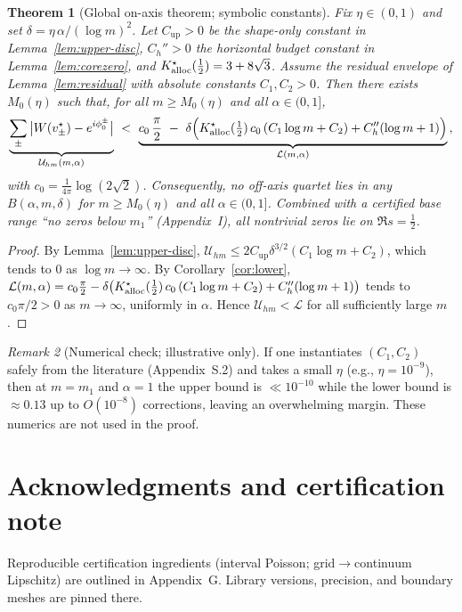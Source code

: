 \documentclass[11pt]{article}
\numberwithin{equation}{section}
\newtheorem{theorem}{Theorem}[section]
\theoremstyle{remark}
\newtheorem{remark}[theorem]{Remark}
\begin{document}
\begin{theorem}[Global on-axis theorem; symbolic constants]\label{thm:tail-symbolic}
Fix $\eta\in(0,1)$ and set $\delta=\eta\,\alpha/(\log m)^2$. Let $C_{\mathrm{up}}>0$ be the shape-only constant in Lemma~\ref{lem:upper-disc}, $C_h''>0$ the horizontal budget constant in Lemma~\ref{lem:corezero}, and $K_{\rm alloc}^{\star}(\tfrac12)=3+8\sqrt{3}$. Assume the residual envelope of Lemma~\ref{lem:residual} with absolute constants $C_1,C_2>0$. Then there exists $M_0(\eta)$ such that, for all $m\ge M_0(\eta)$ and all $\alpha\in(0,1]$,
\[
\underbrace{\sum_{\pm}\big|W(v_\pm^\star)-e^{i\phi_0^\pm}\big|}_{\mathcal U_{hm}(m,\alpha)}
\ <\
\underbrace{c_0\,\frac{\pi}{2}\ -\ \delta\Big( K_{\rm alloc}^{\star}(\tfrac12)\,c_0\,(C_1\log m+C_2) + C_h''(\log m+1) \Big)}_{\mathcal L(m,\alpha)}\,,
\]
with $c_0=\frac{1}{4\pi}\log(2\sqrt{2})$. Consequently, no off-axis quartet lies in any $B(\alpha,m,\delta)$ for $m\ge M_0(\eta)$ and all $\alpha\in(0,1]$. Combined with a certified base range “no zeros below $m_1$” (Appendix~I), all nontrivial zeros lie on $\Re s=\tfrac12$.
\end{theorem}

\begin{proof}
By Lemma~\ref{lem:upper-disc}, $\mathcal U_{hm}\le 2C_{\mathrm{up}}\delta^{3/2}(C_1\log m+C_2)$, which tends to $0$ as $\log m\to\infty$. By Corollary~\ref{cor:lower}, $\mathcal L(m,\alpha)=c_0\frac{\pi}{2}-\delta\big(K_{\rm alloc}^{\star}(\tfrac12)\,c_0\,(C_1\log m+C_2)+C_h''(\log m+1)\big)$ tends to $c_0\pi/2>0$ as $m\to\infty$, uniformly in $\alpha$. Hence $\mathcal U_{hm}<\mathcal L$ for all sufficiently large $m$.
\end{proof}

\begin{remark}[Numerical check; illustrative only]
If one instantiates $(C_1,C_2)$ safely from the literature (Appendix~S.2) and takes a small $\eta$ (e.g., $\eta=10^{-9}$), then at $m=m_1$ and $\alpha=1$ the upper bound is $\ll 10^{-10}$ while the lower bound is $\approx 0.13$ up to $O(10^{-8})$ corrections, leaving an overwhelming margin. These numerics are not used in the proof.
\end{remark}

\section*{Acknowledgments and certification note}
Reproducible certification ingredients (interval Poisson; grid$\to$continuum Lipschitz) are outlined in Appendix~G. Library versions, precision, and boundary meshes are pinned there.
\end{document}
